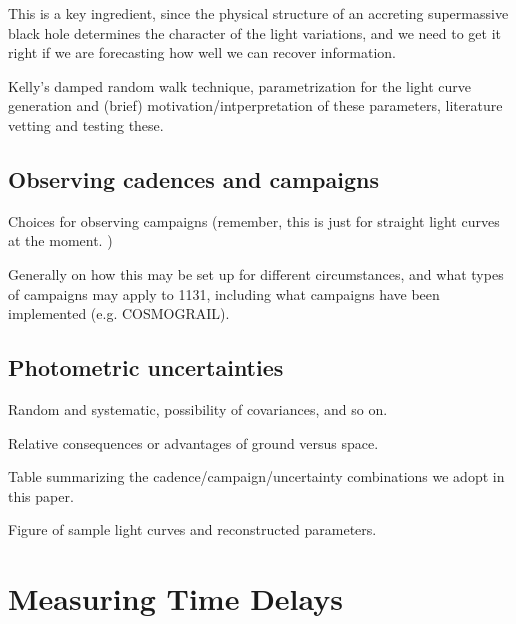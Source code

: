 \documentclass{emulateapj}
\begin{document}
This is a key ingredient, since the physical structure of an accreting supermassive black hole determines the character of the light variations, and we need to get it right if we are forecasting how well we can recover information. 

Kelly's damped random walk technique, parametrization for the light curve generation and (brief) motivation/intperpretation of these parameters, literature vetting and testing these. 
\subsection{Observing cadences and campaigns}\label{}

Choices for observing campaigns (remember, this is just for straight light curves at the moment. )

Generally on how this may be set up for different circumstances, and what types of campaigns may apply to 1131, including what campaigns have been implemented (e.g. COSMOGRAIL). 

\subsection{Photometric uncertainties}\label{}

Random and systematic, possibility of covariances, and so on.  

Relative consequences or advantages of ground versus space. 

Table summarizing the cadence/campaign/uncertainty combinations we adopt in this paper. 

Figure of sample light curves and reconstructed parameters. 


\section{Measuring Time Delays}
\end{document}
